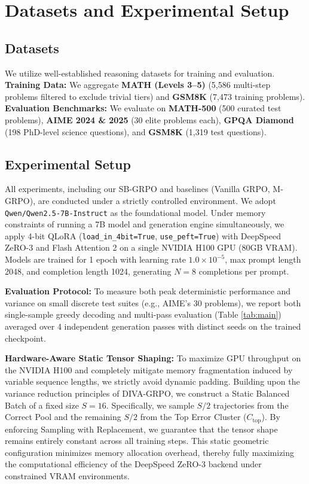 \section{Datasets and Experimental Setup}

\subsection{Datasets}
We utilize well-established reasoning datasets for training and evaluation. \textbf{Training Data:} We aggregate \textbf{MATH (Levels 3--5)} \cite{hendrycks2021measuringmathematicalproblemsolving} (5,586 multi-step problems filtered to exclude trivial tiers) and \textbf{GSM8K} \cite{cobbe2021trainingverifierssolvemath} (7,473 training problems). \textbf{Evaluation Benchmarks:} We evaluate on \textbf{MATH-500} (500 curated test problems), \textbf{AIME 2024 \& 2025} (30 elite problems each), \textbf{GPQA Diamond} \cite{rein2023gpqagraduatelevelgoogleproofqa} (198 PhD-level science questions), and \textbf{GSM8K} (1,319 test questions).

\subsection{Experimental Setup}
All experiments, including our SB-GRPO and baselines (Vanilla GRPO, M-GRPO), are conducted under a strictly controlled environment. We adopt \texttt{Qwen/}\allowbreak\texttt{Qwen2.5-7B-Instruct} as the foundational model. Under memory constraints of running a 7B model and generation engine simultaneously, we apply 4-bit QLoRA \cite{hu2021loralowrankadaptationlarge,dettmers2023qloraefficientfinetuningquantized} (\texttt{load\_in\_4bit=True}, \texttt{use\_peft=True}) with DeepSpeed ZeRO-3 and Flash Attention 2 on a single NVIDIA H100 GPU (80GB VRAM). Models are trained for 1 epoch with learning rate $1.0 \times 10^{-5}$, max prompt length 2048, and completion length 1024, generating $N=8$ completions per prompt.

\textbf{Evaluation Protocol:} To measure both peak deterministic performance and variance on small discrete test suites (e.g., AIME's 30 problems), we report both single-sample greedy decoding and multi-pass evaluation (Table \ref{tab:main}) averaged over 4 independent generation passes with distinct seeds on the trained checkpoint.

\textbf{Hardware-Aware Static Tensor Shaping:} To maximize GPU throughput on the NVIDIA H100 and completely mitigate memory fragmentation induced by variable sequence lengths, we strictly avoid dynamic padding. Building upon the variance reduction principles of DIVA-GRPO, we construct a Static Balanced Batch of a fixed size $S = 16$. Specifically, we sample $S/2$ trajectories from the Correct Pool and the remaining $S/2$ from the Top Error Cluster ($C_{\text{top}}$). By enforcing Sampling with Replacement, we guarantee that the tensor shape remains entirely constant across all training steps. This static geometric configuration minimizes memory allocation overhead, thereby fully maximizing the computational efficiency of the DeepSpeed ZeRO-3 backend under constrained VRAM environments.